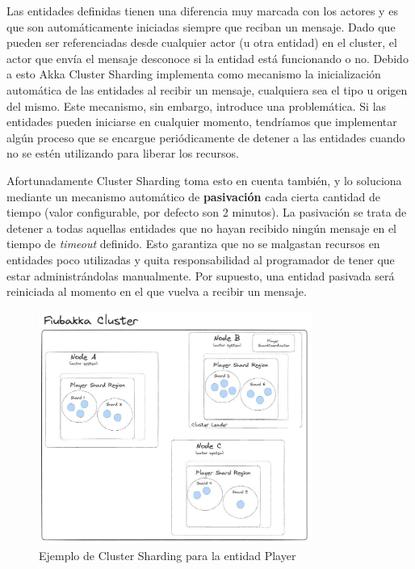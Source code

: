 Las entidades definidas tienen una diferencia muy marcada con los actores y es que son automáticamente iniciadas siempre que reciban un mensaje. Dado que pueden ser referenciadas
desde cualquier actor (u otra entidad) en el cluster, el actor que envía el mensaje desconoce si la entidad está funcionando o no. Debido a esto Akka Cluster Sharding implementa como mecanismo
la inicialización automática de las entidades al recibir un mensaje, cualquiera sea el tipo u origen del mismo. Este mecanismo, sin embargo, introduce una problemática. Si las entidades pueden iniciarse
en cualquier momento, tendríamos que implementar algún proceso que se encargue periódicamente de detener a las entidades cuando no se estén utilizando para liberar los recursos.

Afortunadamente Cluster Sharding toma esto en cuenta también, y lo soluciona mediante un mecanismo automático de \textbf{pasivación} cada cierta cantidad de tiempo (valor configurable, por defecto
son 2 minutos). La pasivación se trata de detener a todas aquellas entidades que no hayan recibido ningún mensaje en el tiempo de \textit{timeout} definido. Esto garantiza que no se malgastan recursos
en entidades poco utilizadas y quita responsabilidad al programador de tener que estar administrándolas manualmente. Por supuesto, una entidad pasivada será reiniciada al momento en el que vuelva a recibir un mensaje.

\begin{figure}[htbp]
    \centering
    \includegraphics[width=0.8\textwidth]{../assets/cluster-sharding-example.jpeg}
    \caption{Ejemplo de Cluster Sharding para la entidad Player}
\end{figure}

